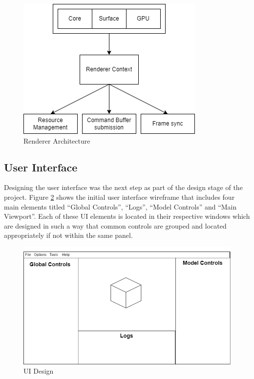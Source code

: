 \documentclass[11pt]{article}
\begin{document}
\begin{figure}[ht]
  \centering
  \includegraphics[width=\textwidth]{images/renderer_architecture.png}
  \caption{Renderer Architecture}
  \label{fig:rendererarch}
\end{figure}

\subsection{User Interface}
Designing the user interface was the next step as part of the design stage of
the project. Figure \ref{fig:ui_design} shows the initial user interface
wireframe that includes four main elements titled ``Global Controls'', ``Logs'',
``Model Controls'' and ``Main Viewport''. Each of these UI elements is located
in their respective windows which are designed in such a way that common
controls are grouped and located appropriately if not within the same panel.

\begin{figure}[ht]
  \centering
  \includegraphics[width=\textwidth]{images/ui_design.png}
  \caption{UI Design}
  \label{fig:ui_design}
\end{figure}
\end{document}
